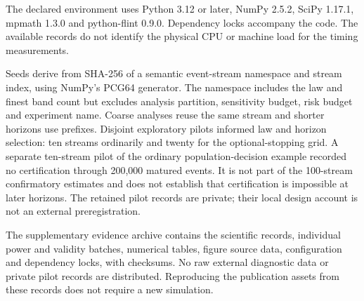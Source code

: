 The declared environment uses Python 3.12 or later, NumPy 2.5.2, SciPy 1.17.1, mpmath 1.3.0 and python-flint 0.9.0. Dependency locks accompany the code. The available records do not identify the physical CPU or machine load for the timing measurements.

Seeds derive from SHA-256 of a semantic event-stream namespace and stream index, using NumPy's PCG64 generator. The namespace includes the law and finest band count but excludes analysis partition, sensitivity budget, risk budget and experiment name. Coarse analyses reuse the same stream and shorter horizons use prefixes. Disjoint exploratory pilots informed law and horizon selection: ten streams ordinarily and twenty for the optional-stopping grid. A separate ten-stream pilot of the ordinary population-decision example recorded no certification through 200,000 matured events. It is not part of the 100-stream confirmatory estimates and does not establish that certification is impossible at later horizons. The retained pilot records are private; their local design account is not an external preregistration.

The supplementary evidence archive contains the scientific records, individual power and validity batches, numerical tables, figure source data, configuration and dependency locks, with checksums. No raw external diagnostic data or private pilot records are distributed. Reproducing the publication assets from these records does not require a new simulation.
